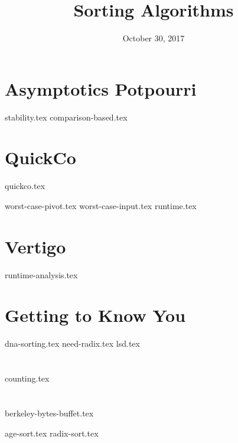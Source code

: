 \documentclass[11pt]{exam}
\title{Sorting Algorithms}
\date{October 30, 2017}
\begin{document}
\maketitle

\section{Asymptotics Potpourri}
{stability.tex}
{comparison-based.tex}

\section{QuickCo}
{quickco.tex}
\begin{questions}
{worst-case-pivot.tex}
{worst-case-input.tex}
{runtime.tex}
\end{questions}

\section{Vertigo}
\begin{questions}
{runtime-analysis.tex}
\end{questions}

\clearpage

\section{Getting to Know You}
\begin{questions}
{dna-sorting.tex}
{need-radix.tex}
{lsd.tex}
\end{questions}

\section{}
{counting.tex}

\section{}
{berkeley-bytes-buffet.tex}
\begin{questions}
{age-sort.tex}
{radix-sort.tex}
\end{questions}
\end{document}
